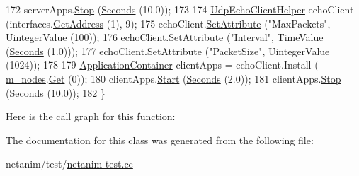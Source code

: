 \begin{DoxyCode}
172   serverApps.\hyperlink{classns3_1_1ApplicationContainer_adfc52f9aa4020c8714679b00bbb9ddb3}{Stop} (\hyperlink{group__timecivil_ga33c34b816f8ff6628e33d5c8e9713b9e}{Seconds} (10.0));
173 
174   \hyperlink{classns3_1_1UdpEchoClientHelper}{UdpEchoClientHelper} echoClient (interfaces.\hyperlink{classns3_1_1Ipv4InterfaceContainer_ae63208dcd222be986822937ee4aa828c}{GetAddress} (1), 9);
175   echoClient.\hyperlink{classns3_1_1UdpEchoClientHelper_a11228c069ad896f8ed13f4d37c13f51d}{SetAttribute} (\textcolor{stringliteral}{"MaxPackets"}, UintegerValue (100));
176   echoClient.SetAttribute (\textcolor{stringliteral}{"Interval"}, TimeValue (\hyperlink{group__timecivil_ga33c34b816f8ff6628e33d5c8e9713b9e}{Seconds} (1.0)));
177   echoClient.SetAttribute (\textcolor{stringliteral}{"PacketSize"}, UintegerValue (1024));
178 
179   \hyperlink{classns3_1_1ApplicationContainer}{ApplicationContainer} clientApps = echoClient.Install (
      \hyperlink{classAbstractAnimationInterfaceTestCase_aa051bd1bbd7f335a863a168c27167b38}{m\_nodes}.\hyperlink{classns3_1_1NodeContainer_a9ed96e2ecc22e0f5a3d4842eb9bf90bf}{Get} (0));
180   clientApps.\hyperlink{classns3_1_1ApplicationContainer_a8eff87926507020bbe3e1390358a54a7}{Start} (\hyperlink{group__timecivil_ga33c34b816f8ff6628e33d5c8e9713b9e}{Seconds} (2.0));
181   clientApps.\hyperlink{classns3_1_1ApplicationContainer_adfc52f9aa4020c8714679b00bbb9ddb3}{Stop} (\hyperlink{group__timecivil_ga33c34b816f8ff6628e33d5c8e9713b9e}{Seconds} (10.0));
182 \}
\end{DoxyCode}


Here is the call graph for this function\+:




The documentation for this class was generated from the following file\+:\begin{DoxyCompactItemize}
\item 
netanim/test/\hyperlink{netanim-test_8cc}{netanim-\/test.\+cc}\end{DoxyCompactItemize}
